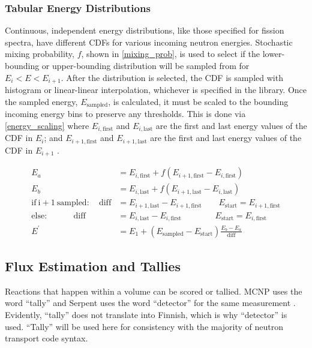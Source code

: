 \subsubsection{Tabular Energy Distributions}

Continuous, independent energy distributions, like those specified for fission spectra, have different CDFs for various incoming neutron energies.  Stochastic mixing probability, $f$, shown in \eqref{mixing_prob}, is used to select if the lower-bounding or upper-bounding distribution will be sampled from for $E_i < E < E_{i+1}$.  After the distribution is selected, the CDF is sampled with histogram or linear-linear interpolation, whichever is specified in the library.  Once the sampled energy, $E_\mathrm{sampled}$, is calculated, it must be scaled to the bounding incoming energy bins to preserve any thresholds.  This is done via \eqref{energy_scaling} where $E_{i,\mathrm{first}}$ and $E_{i,\mathrm{last}}$ are the first and last energy values of the CDF in $E_i$; and $E_{i+1,\mathrm{first}}$ and $E_{i+1,\mathrm{last}}$ are the first and last energy values of the CDF in $E_{i+1}$ \cite{mcnp}.

\begin{equation}
\label{energy_scaling}
\begin{split}
E_a &= E_{i,\mathrm{first}} +  f( E_{i+1,\mathrm{first}} - E_{i,\mathrm{first}} ) \\
E_b &= E_{i,\mathrm{last}} +  f( E_{i+1,\mathrm{last}} - E_{i,\mathrm{last}} ) \\
\mathrm{if\:i+1\:sampled:} \quad \mathrm{diff} &= E_{i+1,\mathrm{last}}  - E_{i+1,\mathrm{first}}  \qquad E_\mathrm{start}= E_{i+1,\mathrm{first}}  \\
\mathrm{else:}          \qquad \quad       \mathrm{diff} &= E_{i,\mathrm{last}}  - E_{i,\mathrm{first}}  \qquad \qquad E_\mathrm{start}= E_{i,\mathrm{first}}  \\
E^\prime &=  E_1  +  ( E_\mathrm{sampled} - E_\mathrm{start})  \frac{ E_b - E_a}{ \mathrm{diff} }  
\end{split}
\end{equation}%


\subsection{Flux Estimation and Tallies}

Reactions that happen within a volume can be scored or tallied.  %
MCNP uses the word ``tally'' and Serpent uses the word ``detector'' for the same measurement \cite{serpent,mcnp}.  Evidently, ``tally'' does not translate into Finnish, which is why ``detector'' is used.  ``Tally'' will be used here for consistency with the majority of neutron transport code syntax.  

